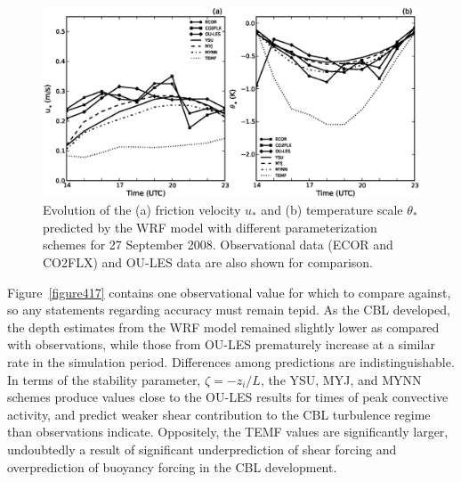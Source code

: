 \begin{figure}[ht!]
\begin{center}
\includegraphics[width=\textwidth]{figures/chapter4/ust_tst_phys_20080927}
\end{center}
\caption{Evolution of the (a) friction velocity $u_*$ and (b) temperature scale $\theta_*$ predicted by the WRF model with different parameterization schemes for 27 September 2008. Observational data (ECOR and CO2FLX) and OU-LES data are also shown for comparison.}
\label{figure416}
\end{figure}


Figure~\ref{figure417} contains one observational value for which to compare against, so any statements regarding accuracy must remain tepid. As the CBL developed, the depth estimates from the WRF model remained slightly lower as compared with observations, while those from OU-LES prematurely increase at a similar rate in the simulation period. Differences among predictions are indistinguishable. In terms of the stability parameter, $\zeta = -z_i / L$, the YSU, MYJ, and MYNN schemes produce values close to the OU-LES results for times of peak convective activity, and predict weaker shear contribution to the CBL turbulence regime than observations indicate. Oppositely, the TEMF values are significantly larger, undoubtedly a result of significant underprediction of shear forcing and overprediction of buoyancy forcing in the CBL development. 


